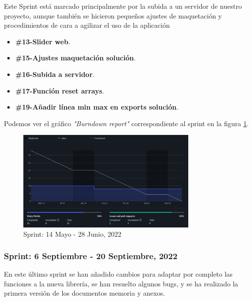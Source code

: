 Este Sprint está marcado principalmente por la subida a un servidor de nuestro proyecto, aunque también se hicieron pequeños ajustes de maquetación y procedimientos de cara a agilizar el uso de la aplicación

\begin{itemize}
    \item \textbf{\#13-Slider web}.
    \item \textbf{\#15-Ajustes maquetación solución}.
    \item \textbf{\#16-Subida a servidor}.
    \item \textbf{\#17-Función reset arrays}.
    \item \textbf{\#19-Añadir línea min max en exports solución}.
\end{itemize}

Podemos ver el gráfico \textit{"Burndown report"} correspondiente al sprint en la figura \ref{fig:sprint_14_28_jun}.

\begin{figure}[h!] 
\centering
    \includegraphics[width=0.8\textwidth]{img/sprint_14_28_jun.PNG}
\caption{Sprint: 14 Mayo - 28 Junio, 2022}
\label{fig:sprint_14_28_jun}
\end{figure}

\newpage
\subsubsection{Sprint: 6 Septiembre - 20 Septiembre, 2022}

En este último sprint se han añadido cambios para adaptar por completo las funciones a la nueva librería, se han resuelto algunos bugs, y se ha realizado la primera versión de los documentos memoria y anexos.

